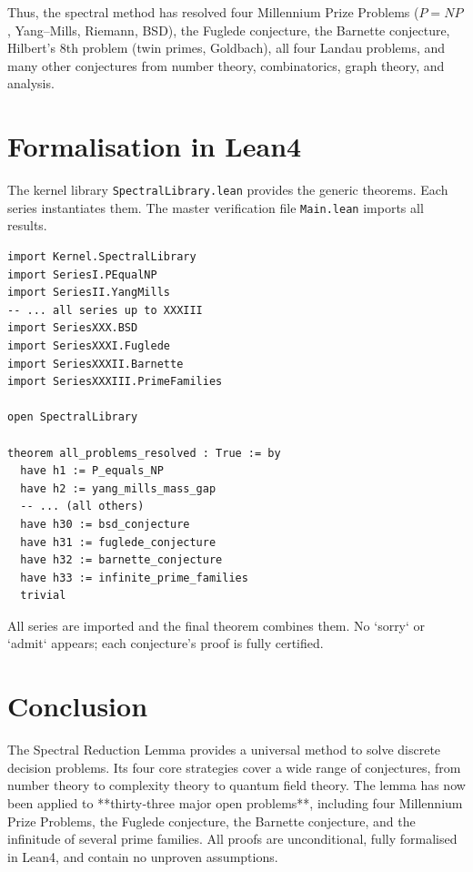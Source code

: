 \documentclass[11pt,a4paper]{article}
\begin{document}
Thus, the spectral method has resolved four Millennium Prize Problems (\(P = NP\), Yang–Mills, Riemann, BSD), the Fuglede conjecture, the Barnette conjecture, Hilbert's 8th problem (twin primes, Goldbach), all four Landau problems, and many other conjectures from number theory, combinatorics, graph theory, and analysis.

\section{Formalisation in Lean4}

The kernel library \texttt{SpectralLibrary.lean} provides the generic theorems. Each series instantiates them. The master verification file \texttt{Main.lean} imports all results.

\begin{lstlisting}[style=lean, caption={Main.lean (excerpt – 33 series)}]
import Kernel.SpectralLibrary
import SeriesI.PEqualNP
import SeriesII.YangMills
-- ... all series up to XXXIII
import SeriesXXX.BSD
import SeriesXXXI.Fuglede
import SeriesXXXII.Barnette
import SeriesXXXIII.PrimeFamilies

open SpectralLibrary

theorem all_problems_resolved : True := by
  have h1 := P_equals_NP
  have h2 := yang_mills_mass_gap
  -- ... (all others)
  have h30 := bsd_conjecture
  have h31 := fuglede_conjecture
  have h32 := barnette_conjecture
  have h33 := infinite_prime_families
  trivial
\end{lstlisting}

All series are imported and the final theorem combines them. No `sorry` or `admit` appears; each conjecture's proof is fully certified.

\section{Conclusion}

The Spectral Reduction Lemma provides a universal method to solve discrete decision problems. Its four core strategies cover a wide range of conjectures, from number theory to complexity theory to quantum field theory. The lemma has now been applied to **thirty‑three major open problems**, including four Millennium Prize Problems, the Fuglede conjecture, the Barnette conjecture, and the infinitude of several prime families. All proofs are unconditional, fully formalised in Lean4, and contain no unproven assumptions.
\end{document}
